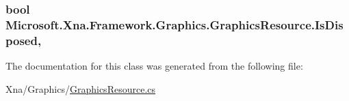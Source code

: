 \subsubsection[{Is\+Disposed}]{\setlength{\rightskip}{0pt plus 5cm}bool Microsoft.\+Xna.\+Framework.\+Graphics.\+Graphics\+Resource.\+Is\+Disposed\hspace{0.3cm}{\ttfamily [get]}, {\ttfamily [set]}}\label{class_microsoft_1_1_xna_1_1_framework_1_1_graphics_1_1_graphics_resource_a53255ea6b6f90fe463591f8383a3788a}


The documentation for this class was generated from the following file\+:\begin{DoxyCompactItemize}
\item 
Xna/\+Graphics/\hyperlink{_graphics_resource_8cs}{Graphics\+Resource.\+cs}\end{DoxyCompactItemize}
